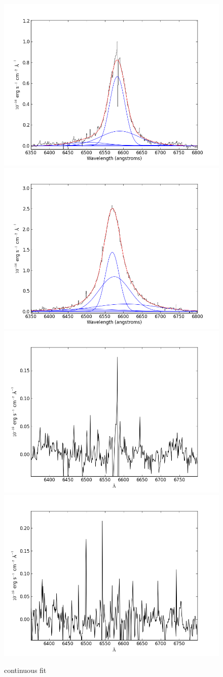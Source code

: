 \documentclass[usenatbib]{mn2e}
\begin{document}
\newpage

\begin{figure}
\begin{center}
\includegraphics[width=0.46\linewidth,angle=0]{Halpha_8.png}
\vspace{5mm}
\includegraphics[width=0.49\linewidth,angle=0]{Halpha_9.png}\\
\includegraphics[width=0.46\linewidth,angle=0]{Halpha_res_8.png}
\hspace{5mm}
\includegraphics[width=0.49\linewidth,angle=0]{Halpha_res_9.png}\\
\end{center} 
\caption{continuous fit \label{fig:landscape}}   
\end{figure}
\end{document}
